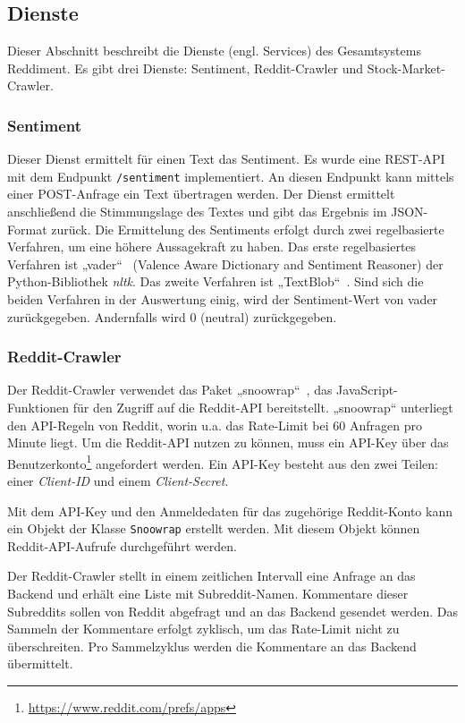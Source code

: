 \documentclass[a4paper, 10pt, conference]{IEEEtran}
\begin{document}
\subsection{Dienste} \label{sub:services}

Dieser Abschnitt beschreibt die Dienste (engl. Services) des Gesamtsystems Reddiment. Es gibt drei Dienste: Sentiment, Reddit-Crawler und Stock-Market-Crawler.

\subsubsection{Sentiment}

Dieser Dienst ermittelt für einen Text das Sentiment. Es wurde eine REST-API mit dem Endpunkt \texttt{/sentiment} implementiert. An diesen Endpunkt kann mittels einer POST-Anfrage ein Text übertragen werden. Der Dienst ermittelt anschließend die Stimmungslage des Textes und gibt das Ergebnis im JSON-Format zurück. Die Ermittelung des Sentiments erfolgt durch zwei regelbasierte Verfahren, um eine höhere Aussagekraft zu haben. Das erste regelbasiertes Verfahren ist „vader“~\cite{vader} (Valence Aware Dictionary and Sentiment Reasoner) der Python-Bibliothek \textit{nltk}.  Das zweite Verfahren ist „TextBlob“~\cite{textblob}. Sind sich die beiden Verfahren in der Auswertung einig, wird der Sentiment-Wert von vader zurückgegeben. Andernfalls wird 0 (neutral) zurückgegeben.

\subsubsection{Reddit-Crawler}

Der Reddit-Crawler verwendet das Paket „snoowrap“~\cite{snoowrap}, das JavaScript-Funktionen für den Zugriff auf die Reddit-API bereitstellt. „snoowrap“ unterliegt den API-Regeln von Reddit, worin u.a. das Rate-Limit bei 60 Anfragen pro Minute liegt. Um die Reddit-API nutzen zu können, muss ein API-Key über das Benutzerkonto\footnote{\url{https://www.reddit.com/prefs/apps}} angefordert werden. Ein API-Key besteht aus den zwei Teilen: einer \textit{Client-ID} und einem \textit{Client-Secret}.

Mit dem API-Key und den Anmeldedaten für das zugehörige Reddit-Konto kann ein Objekt der Klasse \texttt{Snoowrap} erstellt werden. Mit diesem Objekt können Reddit-API-Aufrufe durchgeführt werden.

Der Reddit-Crawler stellt in einem zeitlichen Intervall eine Anfrage an das Backend und erhält eine Liste mit Subreddit-Namen. Kommentare dieser Subreddits sollen von Reddit abgefragt und an das Backend gesendet werden.
Das Sammeln der Kommentare erfolgt zyklisch, um das Rate-Limit nicht zu überschreiten. Pro Sammelzyklus werden die Kommentare an das Backend übermittelt.
\end{document}
